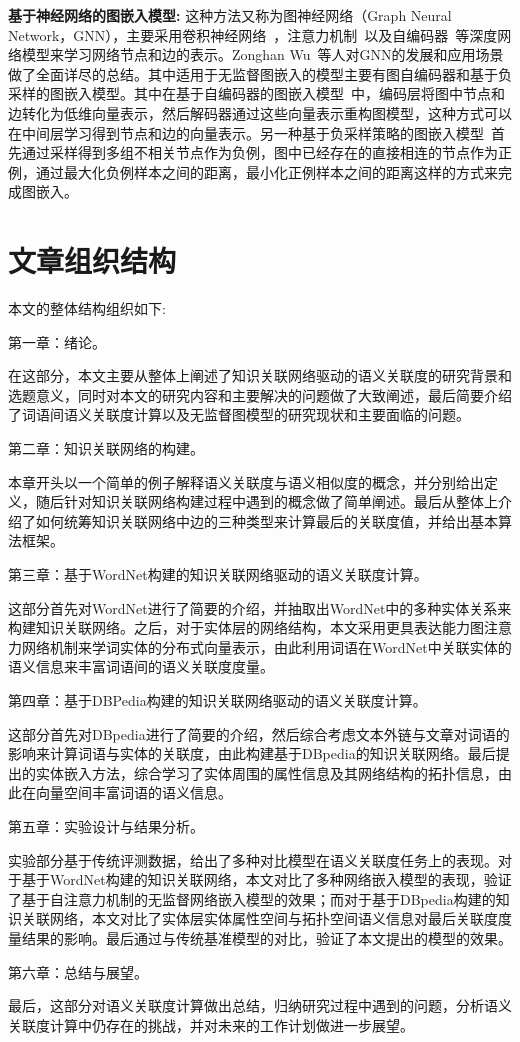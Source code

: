 \textbf{基于神经网络的图嵌入模型:}
这种方法又称为图神经网络（Graph Neural Network，GNN），主要采用卷积神经网络~\cite{MP/Yann}，注意力机制~\cite{corr/VaswaniSPUJGKP17}以及自编码器~\cite{icml/VincentLBM08}等深度网络模型来学习网络节点和边的表示。Zonghan Wu~\cite{corr/Zonghan19}等人对GNN的发展和应用场景做了全面详尽的总结。其中适用于无监督图嵌入的模型主要有图自编码器和基于负采样的图嵌入模型。其中在基于自编码器的图嵌入模型~\cite{corr/KipfW16a, ijcai/PanHLJYZ18}中，编码层将图中节点和边转化为低维向量表示，然后解码器通过这些向量表示重构图模型，这种方式可以在中间层学习得到节点和边的向量表示。另一种基于负采样策略的图嵌入模型~\cite{nips/HamiltonYL17}首先通过采样得到多组不相关节点作为负例，图中已经存在的直接相连的节点作为正例，通过最大化负例样本之间的距离，最小化正例样本之间的距离这样的方式来完成图嵌入。

\section{文章组织结构}
本文的整体结构组织如下:

第一章：绪论。

在这部分，本文主要从整体上阐述了知识关联网络驱动的语义关联度的研究背景和选题意义，同时对本文的研究内容和主要解决的问题做了大致阐述，最后简要介绍了词语间语义关联度计算以及无监督图模型的研究现状和主要面临的问题。

第二章：知识关联网络的构建。

本章开头以一个简单的例子解释语义关联度与语义相似度的概念，并分别给出定义，随后针对知识关联网络构建过程中遇到的概念做了简单阐述。最后从整体上介绍了如何统筹知识关联网络中边的三种类型来计算最后的关联度值，并给出基本算法框架。

第三章：基于WordNet构建的知识关联网络驱动的语义关联度计算。

这部分首先对WordNet进行了简要的介绍，并抽取出WordNet中的多种实体关系来构建知识关联网络。之后，对于实体层的网络结构，本文采用更具表达能力图注意力网络机制来学词实体的分布式向量表示，由此利用词语在WordNet中关联实体的语义信息来丰富词语间的语义关联度度量。


第四章：基于DBPedia构建的知识关联网络驱动的语义关联度计算。

这部分首先对DBpedia进行了简要的介绍，然后综合考虑文本外链与文章对词语的影响来计算词语与实体的关联度，由此构建基于DBpedia的知识关联网络。最后提出的实体嵌入方法，综合学习了实体周围的属性信息及其网络结构的拓扑信息，由此在向量空间丰富词语的语义信息。

第五章：实验设计与结果分析。

实验部分基于传统评测数据，给出了多种对比模型在语义关联度任务上的表现。对于基于WordNet构建的知识关联网络，本文对比了多种网络嵌入模型的表现，验证了基于自注意力机制的无监督网络嵌入模型的效果；而对于基于DBpedia构建的知识关联网络，本文对比了实体层实体属性空间与拓扑空间语义信息对最后关联度度量结果的影响。最后通过与传统基准模型的对比，验证了本文提出的模型的效果。


第六章：总结与展望。

最后，这部分对语义关联度计算做出总结，归纳研究过程中遇到的问题，分析语义关联度计算中仍存在的挑战，并对未来的工作计划做进一步展望。
